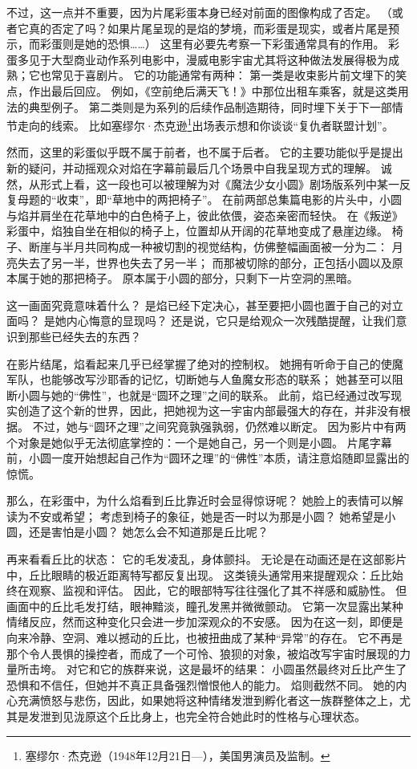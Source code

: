 不过，这一点并不重要，因为片尾彩蛋本身已经对前面的图像构成了否定。
（或者它真的否定了吗？如果片尾呈现的是焰的梦境，而彩蛋是现实，或者片尾是预示，而彩蛋则是她的恐惧……）
这里有必要先考察一下彩蛋通常具有的作用。
彩蛋多见于大型商业动作系列电影中，漫威电影宇宙尤其将这种做法发展得极为成熟；它也常见于喜剧片。
它的功能通常有两种：
第一类是收束影片前文埋下的笑点，作出最后回应。
例如，《空前绝后满天飞！》中那位出租车乘客，就是这类用法的典型例子\cite{airplane-amazon-video}。
第二类则是为系列的后续作品制造期待，同时埋下关于下一部情节走向的线索。
比如塞缪尔·杰克逊\footnote{%
    塞缪尔·杰克逊（1948年12月21日—），美国男演员及监制。
}出场表示想和你谈谈“复仇者联盟计划”\cite{iron-man-amazon-video}。

然而，这里的彩蛋似乎既不属于前者，也不属于后者。
它的主要功能似乎是提出新的疑问，并动摇观众对焰在字幕前最后几个场景中自我呈现方式的理解。
诚然，从形式上看，这一段也可以被理解为对《魔法少女小圆》剧场版系列中某一反复母题的“收束”，即“草地中的两把椅子”。
在前两部总集篇电影的片头中，小圆与焰并肩坐在花草地中的白色椅子上，彼此依偎，姿态亲密而轻快。
在《叛逆》彩蛋中，焰独自坐在相似的椅子上，位置却从开阔的花草地变成了悬崖边缘。
椅子、断崖与半月共同构成一种被切割的视觉结构，仿佛整幅画面被一分为二：
月亮失去了另一半，世界也失去了另一半；
而那被切除的部分，正包括小圆以及原本属于她的那把椅子。
原本属于小圆的部分，只剩下一片空洞的黑暗。

这一画面究竟意味着什么？
是焰已经下定决心，甚至要把小圆也置于自己的对立面吗？
是她内心悔意的显现吗？
还是说，它只是给观众一次残酷提醒，让我们意识到那些已经失去的东西？

在影片结尾，焰看起来几乎已经掌握了绝对的控制权。
她拥有听命于自己的使魔军队，也能够改写沙耶香的记忆，切断她与人鱼魔女形态的联系；
她甚至可以阻断小圆与她的“佛性”，也就是“圆环之理”之间的联系。
此前，焰已经通过改写现实创造了这个新的世界，因此，把她视为这一宇宙内部最强大的存在，并非没有根据。
不过，她与“圆环之理”之间究竟孰强孰弱，仍然难以断定。
因为影片中有两个对象是她似乎无法彻底掌控的：一个是她自己，另一个则是小圆。
片尾字幕前，小圆一度开始想起自己作为“圆环之理”的“佛性”本质，请注意焰随即显露出的惊慌。

那么，在彩蛋中，为什么焰看到丘比靠近时会显得惊讶呢？
她脸上的表情可以解读为不安或希望；
考虑到椅子的象征，她是否一时以为那是小圆？
她希望是小圆，还是害怕是小圆？
她怎么会不知道那是丘比呢？

再来看看丘比的状态：
它的毛发凌乱，身体颤抖。
无论是在动画还是在这部影片中，丘比眼睛的极近距离特写都反复出现。
这类镜头通常用来提醒观众：丘比始终在观察、监视和评估。
因此，它的眼部特写往往强化了其不祥感和威胁性。
但画面中的丘比毛发打结，眼神黯淡，瞳孔发黑并微微颤动。
它第一次显露出某种情绪反应，然而这种变化只会进一步加深观众的不安感。
因为在这一刻，即便是向来冷静、空洞、难以撼动的丘比，也被扭曲成了某种“异常”的存在。
它不再是那个令人畏惧的操控者，而成了一个可怜、狼狈的对象，被焰改写宇宙时展现的力量所击垮。
对它和它的族群来说，这是最坏的结果：
小圆虽然最终对丘比产生了恐惧和不信任，但她并不真正具备强烈憎恨他人的能力。
焰则截然不同。
她的内心充满愤怒与悲伤，因此，如果她将这种情绪发泄到孵化者这一族群整体之上，尤其是发泄到见泷原这个丘比身上，也完全符合她此时的性格与心理状态。


